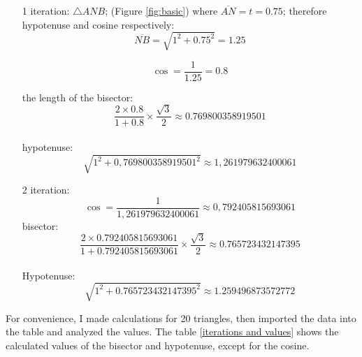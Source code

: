 \documentclass[12pt, letterpaper, oneside]{report}
\begin{document}
\begin{enumerate}

\item[1] iteration: $\triangle ANB$; (Figure \ref{fig:basic}) where $\overline{AN}=t=0.75$; therefore hypotenuse and cosine respectively:
\begin{equation}
 \overline{NB}=\sqrt{1^{2}+0.75^{2}}=1.25
 \end{equation}

\begin{equation}
\cos=\dfrac{1}{1.25}=0.8
\end{equation}

the length of the bisector:
\begin{equation}
 \frac{2\times0.8}{1+0.8}\times\frac{\sqrt{3}}{2}\approx 0.769800358919501
\end{equation}
\\
hypotenuse:
\begin{equation}
\sqrt{1^{2}+0,769800358919501^{2}}\approx 1,261979632400061
\end{equation}
\item[2] iteration:
\begin{equation}
\cos=\dfrac{1}{1,261979632400061}\approx0,792405815693061
\end{equation}
bisector:
\begin{equation}
\frac{2\times 0.792405815693061}{1+0.792405815693061}\times\frac{\sqrt{3}}{2}\approx 0.765723432147395
\end{equation}
\\
Hypotenuse:
\begin{equation}
\sqrt{1^{2}+0.765723432147395^{2}}\approx 1.259496873572772
\end{equation}
\end{enumerate}
For convenience, I made calculations for 20 triangles, then imported the data into the table and analyzed the values.
\newpage
The table \ref{iterations and values} shows the calculated values of the bisector and hypotenuse, except for the cosine.
\\
\vspace{10pt}
\end{document}
